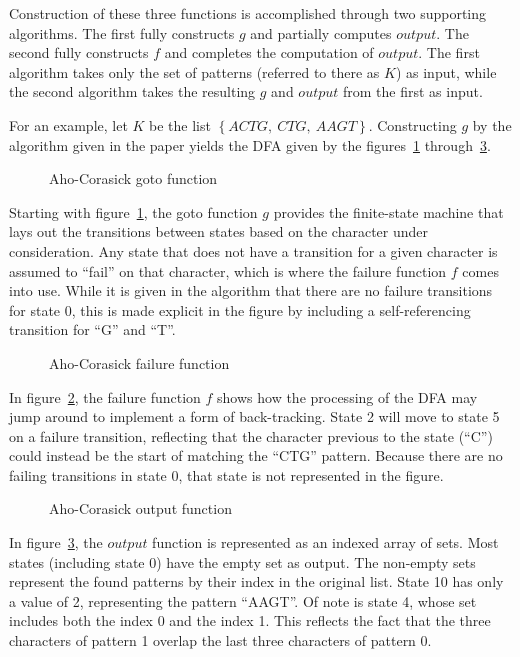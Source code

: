 Construction of these three functions is accomplished through two supporting algorithms. The first fully constructs $g$ and partially computes $output$. The second fully constructs $f$ and completes the computation of $output$. The first algorithm takes only the set of patterns (referred to there as $K$) as input, while the second algorithm takes the resulting $g$ and $output$ from the first as input.

For an example, let $K$ be the list $\left\lbrace ACTG,~CTG,~AAGT \right\rbrace$. Constructing $g$ by the algorithm given in the paper yields the DFA given by the figures~\ref{fig:ac_goto_function} through~\ref{fig:ac_output_function}.

\begin{figure}[ht]
\centering

\caption{Aho-Corasick goto function}
\label{fig:ac_goto_function}
\end{figure}

Starting with figure~\ref{fig:ac_goto_function}, the goto function $g$ provides the finite-state machine that lays out the transitions between states based on the character under consideration. Any state that does not have a transition for a given character is assumed to ``fail'' on that character, which is where the failure function $f$ comes into use. While it is given in the algorithm that there are no failure transitions for state 0, this is made explicit in the figure by including a self-referencing transition for ``G'' and ``T''.

\begin{figure}[ht]
\centering

\caption{Aho-Corasick failure function}
\label{fig:ac_failure_function}
\end{figure}

In figure~\ref{fig:ac_failure_function}, the failure function $f$ shows how the processing of the DFA may jump around to implement a form of back-tracking. State 2 will move to state 5 on a failure transition, reflecting that the character previous to the state (``C'') could instead be the start of matching the ``CTG'' pattern. Because there are no failing transitions in state 0, that state is not represented in the figure.

\begin{figure}[ht]
\centering

\caption{Aho-Corasick output function}
\label{fig:ac_output_function}
\end{figure}

In figure~\ref{fig:ac_output_function}, the $output$ function is represented as an indexed array of sets. Most states (including state 0) have the empty set as output. The non-empty sets represent the found patterns by their index in the original list. State 10 has only a value of 2, representing the pattern ``AAGT''. Of note is state 4, whose set includes both the index 0 and the index 1. This reflects the fact that the three characters of pattern 1 overlap the last three characters of pattern 0.


